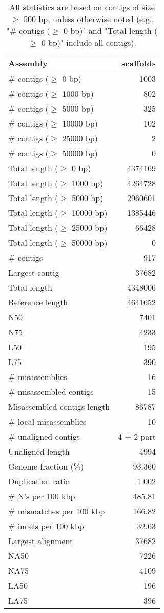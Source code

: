 \documentclass[12pt,a4paper]{article}
\begin{document}
\begin{table}[ht]
\begin{center}
\caption{All statistics are based on contigs of size $\geq$ 500 bp, unless otherwise noted (e.g., "\# contigs ($\geq$ 0 bp)" and "Total length ($\geq$ 0 bp)" include all contigs).}
\begin{tabular}{|l*{1}{|r}|}
\hline
Assembly & scaffolds \\ \hline
\# contigs ($\geq$ 0 bp) & 1003 \\ \hline
\# contigs ($\geq$ 1000 bp) & 802 \\ \hline
\# contigs ($\geq$ 5000 bp) & 325 \\ \hline
\# contigs ($\geq$ 10000 bp) & 102 \\ \hline
\# contigs ($\geq$ 25000 bp) & 2 \\ \hline
\# contigs ($\geq$ 50000 bp) & 0 \\ \hline
Total length ($\geq$ 0 bp) & 4374169 \\ \hline
Total length ($\geq$ 1000 bp) & 4264728 \\ \hline
Total length ($\geq$ 5000 bp) & 2960601 \\ \hline
Total length ($\geq$ 10000 bp) & 1385446 \\ \hline
Total length ($\geq$ 25000 bp) & 66428 \\ \hline
Total length ($\geq$ 50000 bp) & 0 \\ \hline
\# contigs & 917 \\ \hline
Largest contig & 37682 \\ \hline
Total length & 4348006 \\ \hline
Reference length & 4641652 \\ \hline
N50 & 7401 \\ \hline
N75 & 4233 \\ \hline
L50 & 195 \\ \hline
L75 & 390 \\ \hline
\# misassemblies & 16 \\ \hline
\# misassembled contigs & 15 \\ \hline
Misassembled contigs length & 86787 \\ \hline
\# local misassemblies & 10 \\ \hline
\# unaligned contigs & 4 + 2 part \\ \hline
Unaligned length & 4994 \\ \hline
Genome fraction (\%) & 93.360 \\ \hline
Duplication ratio & 1.002 \\ \hline
\# N's per 100 kbp & 485.81 \\ \hline
\# mismatches per 100 kbp & 166.82 \\ \hline
\# indels per 100 kbp & 32.63 \\ \hline
Largest alignment & 37682 \\ \hline
NA50 & 7226 \\ \hline
NA75 & 4109 \\ \hline
LA50 & 196 \\ \hline
LA75 & 396 \\ \hline
\end{tabular}
\end{center}
\end{table}
\end{document}

